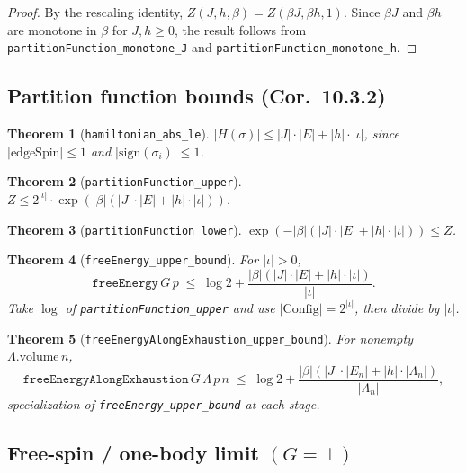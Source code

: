 \documentclass[a4paper,11pt]{article}
\newtheorem{theorem}{Theorem}
\begin{document}
\begin{proof}
By the rescaling identity, $Z(J,h,\beta) = Z(\beta J, \beta h, 1)$.
Since $\beta J$ and $\beta h$ are monotone in $\beta$ for $J, h \ge 0$,
the result follows from \texttt{partitionFunction\_monotone\_J} and
\texttt{partitionFunction\_monotone\_h}.
\end{proof}

\subsection{Partition function bounds (Cor.~10.3.2)}

\begin{theorem}[\texttt{hamiltonian\_abs\_le}]
$|H(\sigma)| \le |J| \cdot |E| + |h| \cdot |\iota|$, since
$|\text{edgeSpin}| \le 1$ and $|\text{sign}(\sigma_i)| \le 1$.
\end{theorem}

\begin{theorem}[\texttt{partitionFunction\_upper}]
$Z \le 2^{|\iota|} \cdot \exp(|\beta|(|J| \cdot |E| + |h| \cdot |\iota|))$.
\end{theorem}

\begin{theorem}[\texttt{partitionFunction\_lower}]
$\exp(-|\beta|(|J| \cdot |E| + |h| \cdot |\iota|)) \le Z$.
\end{theorem}

\begin{theorem}[\texttt{freeEnergy\_upper\_bound}]
For $|\iota| > 0$,
\[
\texttt{freeEnergy}\,G\,p \;\le\; \log 2
  + \frac{|\beta|(|J| \cdot |E| + |h| \cdot |\iota|)}{|\iota|}.
\]
Take $\log$ of \texttt{partitionFunction\_upper} and use
$|\text{Config}| = 2^{|\iota|}$, then divide by $|\iota|$.
\end{theorem}

\begin{theorem}[\texttt{freeEnergyAlongExhaustion\_upper\_bound}]
For nonempty $\Lambda.\text{volume}\,n$,
\[
\texttt{freeEnergyAlongExhaustion}\,G\,\Lambda\,p\,n \;\le\; \log 2
  + \frac{|\beta|(|J| \cdot |E_n| + |h| \cdot |\Lambda_n|)}{|\Lambda_n|},
\]
specialization of \texttt{freeEnergy\_upper\_bound} at each stage.
\end{theorem}

\subsection{Free-spin / one-body limit \texorpdfstring{$(G = \bot)$}{(G = bottom)}}
\end{document}
